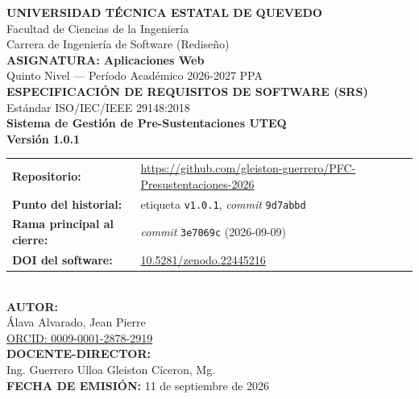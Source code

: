 \documentclass[11pt,a4paper]{article}
\title{}\date{}
\begin{document}
\begin{titlepage}
\centering
\vspace*{0.8cm}
{\LARGE \textbf{UNIVERSIDAD TÉCNICA ESTATAL DE QUEVEDO}}\\[0.3cm]
{\large Facultad de Ciencias de la Ingeniería}\\[0.2cm]
{\large Carrera de Ingeniería de Software (Rediseño)}\\[0.8cm]

{\large \textbf{ASIGNATURA: Aplicaciones Web}}\\[0.3cm]
{\large Quinto Nivel --- Período Académico 2026-2027 PPA}\\[1.0cm]

{\Large \textbf{ESPECIFICACIÓN DE REQUISITOS DE SOFTWARE (SRS)}}\\[0.3cm]
{\large Estándar ISO/IEC/IEEE 29148:2018}\\[0.6cm]
{\LARGE \textbf{Sistema de Gestión de Pre-Sustentaciones UTEQ}}\\[0.6cm]
{\Large \textbf{Versión 1.0.1}}\\[0.9cm]

\small\begin{tabular}{ll}
\textbf{Repositorio:} & \url{https://github.com/gleiston-guerrero/PFC-Presustentaciones-2026} \\
\textbf{Punto del historial:} & etiqueta \texttt{v1.0.1}, \emph{commit} \texttt{9d7abbd} \\
\textbf{Rama principal al cierre:} & \emph{commit} \texttt{3e7069c} (2026-09-09) \\
\textbf{DOI del software:} & \href{https://doi.org/10.5281/zenodo.22445216}{10.5281/zenodo.22445216} \\
\end{tabular}\normalsize\\[1.0cm]

{\large \textbf{AUTOR:}}\\[0.3cm]
{\large Álava Alvarado, Jean Pierre}\\[0.1cm]
{\large \href{https://orcid.org/0009-0001-2878-2919}{ORCID: 0009-0001-2878-2919}}\\[0.8cm]

{\large \textbf{DOCENTE-DIRECTOR:}}\\[0.3cm]
{\large Ing. Guerrero Ulloa Gleiston Cíceron, Mg.}\\[0.8cm]

{\large \textbf{FECHA DE EMISIÓN:} 11 de septiembre de 2026}\\[0.3cm]
\end{titlepage}
\end{document}

